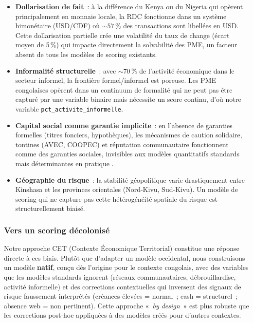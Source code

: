 \documentclass[12pt, a4paper, twocolumn]{article}
\begin{document}
\begin{itemize}[leftmargin=*]
  \item \textbf{Dollarisation de fait}~: à la différence du Kenya ou du Nigeria qui opèrent principalement en monnaie locale, la RDC fonctionne dans un système bimonétaire (USD/CDF) où ${\sim}57\,\%$ des transactions sont libellées en USD. Cette dollarisation partielle crée une volatilité du taux de change (écart moyen de 5\,\%) qui impacte directement la solvabilité des PME, un facteur absent de tous les modèles de scoring existants.
  \item \textbf{Informalité structurelle}~: avec ${\sim}70\,\%$ de l'activité économique dans le secteur informel, la frontière formel/informel est poreuse. Les PME congolaises opèrent dans un continuum de formalité qui ne peut pas être capturé par une variable binaire mais nécessite un score continu, d'où notre variable \texttt{pct\_activite\_informelle}.
  \item \textbf{Capital social comme garantie implicite}~: en l'absence de garanties formelles (titres fonciers, hypothèques), les mécanismes de caution solidaire, tontines (AVEC, COOPEC) et réputation communautaire fonctionnent comme des garanties sociales, invisibles aux modèles quantitatifs standards mais déterminantes en pratique \cite{guerin2015}.
  \item \textbf{Géographie du risque}~: la stabilité géopolitique varie drastiquement entre Kinshasa et les provinces orientales (Nord-Kivu, Sud-Kivu). Un modèle de scoring qui ne capture pas cette hétérogénéité spatiale du risque est structurellement biaisé.
\end{itemize}

\subsubsection{Vers un scoring décolonisé}
\label{subsubsec:scoring_decolonise}

Notre approche CET (Contexte Économique Territorial) constitue une réponse directe à ces biais. Plutôt que d'adapter un modèle occidental, nous construisons un modèle \textbf{natif}, conçu dès l'origine pour le contexte congolais, avec des variables que les modèles standards ignorent (réseaux communautaires, débrouillardise, activité informelle) et des corrections contextuelles qui inversent des signaux de risque faussement interprétés (créances élevées = normal~; cash = structurel~; absence web = non pertinent). Cette approche «~\textit{by design}~» est plus robuste que les corrections post-hoc appliquées à des modèles créés pour d'autres contextes.
\end{document}
